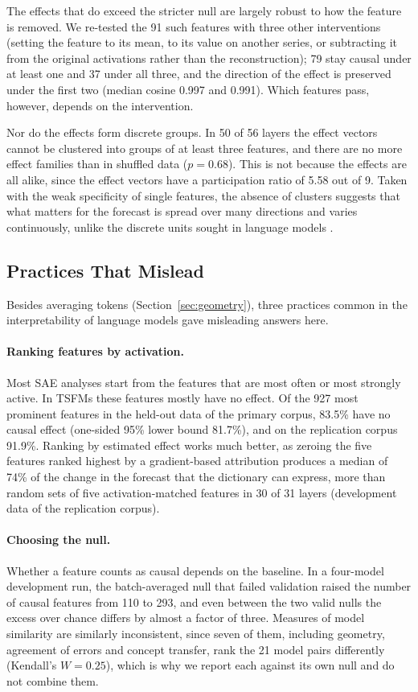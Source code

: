 \documentclass[twoside,11pt]{article}
\begin{document}
The effects that do exceed the stricter null are largely robust to how the feature is removed.
We re-tested the 91 such features with three other interventions (setting the feature to its mean, to its value on another series, or subtracting it from the original activations rather than the reconstruction); 79 stay causal under at least one and 37 under all three, and the direction of the effect is preserved under the first two (median cosine 0.997 and 0.991).
Which features pass, however, depends on the intervention.

Nor do the effects form discrete groups. In 50 of 56 layers the effect vectors cannot be clustered into groups of at least three features, and there are no more effect families than in shuffled data ($p=0.68$).
This is not because the effects are all alike, since the effect vectors have a participation ratio of 5.58 out of 9. Taken with the weak specificity of single features, the absence of clusters suggests that what matters for the forecast is spread over many directions and varies continuously, unlike the discrete units sought in language models \citep{bricken2023monosemanticity}.

\subsection{Practices That Mislead}
\label{sec:shortcuts}

Besides averaging tokens (Section~\ref{sec:geometry}), three practices common in the interpretability of language models gave misleading answers here.

\paragraph{Ranking features by activation.}
Most SAE analyses start from the features that are most often or most strongly active.
In TSFMs these features mostly have no effect. Of the 927 most prominent features in the held-out data of the primary corpus, 83.5\% have no causal effect (one-sided 95\% lower bound 81.7\%), and on the replication corpus 91.9\%.
Ranking by estimated effect works much better, as zeroing the five features ranked highest by a gradient-based attribution produces a median of 74\% of the change in the forecast that the dictionary can express, more than random sets of five activation-matched features in 30 of 31 layers (development data of the replication corpus).

\paragraph{Choosing the null.}
Whether a feature counts as causal depends on the baseline. In a four-model development run, the batch-averaged null that failed validation raised the number of causal features from 110 to 293, and even between the two valid nulls the excess over chance differs by almost a factor of three.
Measures of model similarity are similarly inconsistent, since seven of them, including geometry, agreement of errors and concept transfer, rank the 21 model pairs differently (Kendall's $W=0.25$), which is why we report each against its own null and do not combine them.
\end{document}
